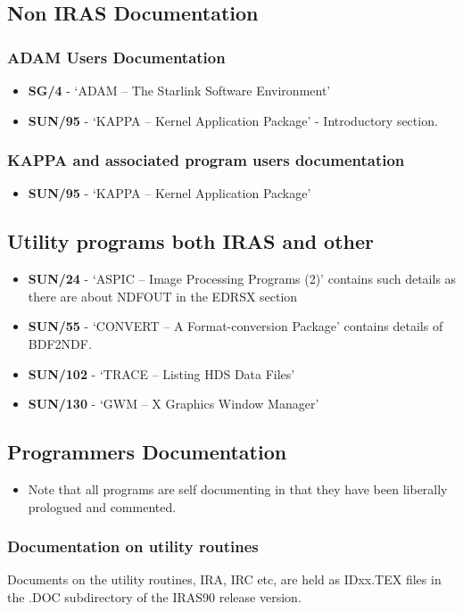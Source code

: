 \subsection{Non IRAS Documentation}
\subsubsection{ADAM Users Documentation}
\begin{itemize}
\item {\bf SG/4} - `ADAM -- The Starlink Software Environment' 
\item {\bf SUN/95} - `KAPPA -- Kernel Application Package' - Introductory
section. 
\end{itemize}
\subsubsection{KAPPA and associated program users documentation}
\begin{itemize}
\item {\bf SUN/95} - `KAPPA -- Kernel Application Package' 
\end{itemize}
\subsection{Utility programs both IRAS and other}
\begin{itemize}
\item {\bf SUN/24} - `ASPIC -- Image Processing Programs (2)' contains such
details as there are about NDFOUT in the EDRSX section
\item {\bf SUN/55} - `CONVERT -- A Format-conversion Package' contains details
of BDF2NDF.
\item {\bf SUN/102} - `TRACE -- Listing HDS Data Files'
\item {\bf SUN/130} - `GWM -- X Graphics Window Manager'
\end{itemize}

\subsection{Programmers Documentation}
\begin{itemize}
\item Note that all programs are self documenting in that they have been 
liberally prologued and commented.
\end{itemize}
\subsubsection{Documentation on utility routines}
Documents on the utility routines, IRA, IRC etc, are held as IDxx.TEX files
in the .DOC subdirectory of the IRAS90 release version. 

